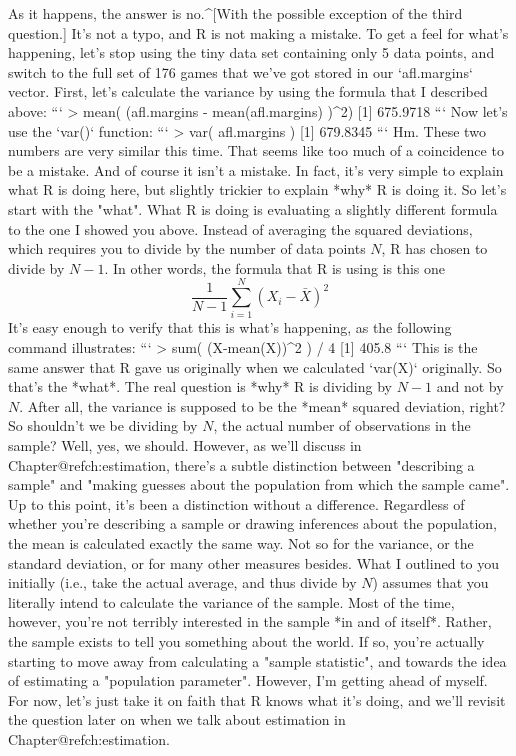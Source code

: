As it happens, the answer is no.^[With the possible exception of the third question.] It's not a typo, and R is not making a mistake. To get a feel for what's happening, let's stop using the tiny data set containing only 5 data points, and switch to the full set of 176 games that we've got stored in our  `afl.margins` vector. First, let's calculate the variance by using the formula that I described above:
```
> mean( (afl.margins - mean(afl.margins) )^2)
[1] 675.9718
```
Now let's use the `var()` function:
```
> var( afl.margins )
[1] 679.8345
```
Hm. These two numbers are very similar this time. That seems like too much of a coincidence to be a mistake. And of course it isn't a mistake. In fact, it's very simple to explain what R is doing here, but slightly trickier to explain *why* R is doing it. So let's start with the "what". What R is doing is evaluating a slightly different formula to the one I showed you above. Instead of averaging the squared deviations, which requires you to divide by the number of data points $N$, R has chosen to divide by $N-1$. In other words, the formula that R is using is this one  
$$
\frac{1}{N-1} \sum_{i=1}^N \left( X_i - \bar{X} \right)^2
$$
It's easy enough to verify that this is what's happening, as the following command illustrates:
```
> sum( (X-mean(X))^2 ) / 4
[1] 405.8
```
This is the same answer that R gave us originally when we calculated `var(X)` originally. So that's the *what*. The real question is *why* R is dividing by $N-1$ and not by $N$. After all, the variance is supposed to be the *mean* squared deviation, right? So shouldn't we be dividing by $N$, the actual number of observations in the sample? Well, yes, we should. However, as we'll discuss in Chapter@refch:estimation, there's a subtle distinction between "describing a sample" and "making guesses about the population from which the sample came". Up to this point, it's been a distinction without a difference. Regardless of whether you're describing a sample or drawing inferences about the population, the mean is calculated exactly the same way. Not so for the variance, or the standard deviation, or for many other measures besides. What I outlined to you initially (i.e., take the actual average, and thus divide by $N$) assumes that you literally intend to calculate the variance of the sample. Most of the time, however, you're not terribly interested in the sample *in and of itself*. Rather, the sample exists to tell you something about the world. If so, you're actually starting to move away from calculating a "sample statistic", and towards the idea of estimating a "population parameter". However, I'm getting ahead of myself. For now, let's just take it on faith that R knows what it's doing, and we'll revisit the question later on when we talk about estimation in Chapter@refch:estimation. 

